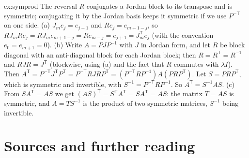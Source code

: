 \begin{solution}{ex:symprod}
\idea The reversal $R$ conjugates a Jordan block to its transpose and is symmetric; conjugating it by the Jordan basis
keeps it symmetric if we use $P^{-\mathsf T}$ on one side.
\writeup (a) $J_me_j=e_{j-1}$ and $Re_j=e_{m+1-j}$, so $RJ_mRe_j=RJ_me_{m+1-j}=Re_{m-j}=e_{j+1}=J_m^{\mathsf T}e_j$ (with the
convention $e_0=e_{m+1}=0$). (b) Write $A=PJP^{-1}$ with $J$ in Jordan form, and let $R$ be block diagonal with an
anti-diagonal block for each Jordan block; then $R=R^{\mathsf T}=R^{-1}$ and $RJR=J^{\mathsf T}$ (blockwise, using (a) and the fact
that $R$ commutes with $\lambda I$). Then
$A^{\mathsf T}=P^{-\mathsf T}J^{\mathsf T}P^{\mathsf T}=P^{-\mathsf T}RJRP^{\mathsf T}=(P^{-\mathsf T}RP^{-1})A(PRP^{\mathsf T})$. Let
$S=PRP^{\mathsf T}$, which is symmetric and invertible, with $S^{-1}=P^{-\mathsf T}RP^{-1}$. So $A^{\mathsf T}=S^{-1}AS$. (c) From
$SA^{\mathsf T}=AS$ we get $(AS)^{\mathsf T}=S^{\mathsf T}A^{\mathsf T}=SA^{\mathsf T}=AS$: the matrix $T=AS$ is symmetric, and $A=TS^{-1}$ is the
product of two symmetric matrices, $S^{-1}$ being invertible.
\end{solution}

\section*{Sources and further reading}

